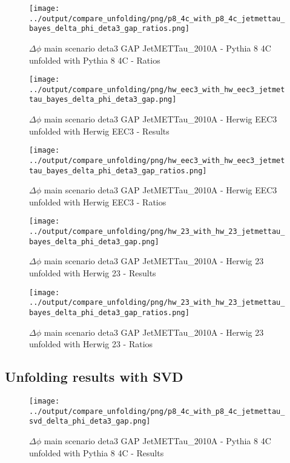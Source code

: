 \documentclass[11pt]{book}
\begin{document}
\begin{figure}[ht]
\centering
\texttt{[image: ../output/compare\_unfolding/png/p8\_4c\_with\_p8\_4c\_jetmettau\_bayes\_delta\_phi\_deta3\_gap\_ratios.png]}
\caption{$\Delta\phi$ main scenario deta3 GAP JetMETTau\_2010A - Pythia 8 4C unfolded with Pythia 8 4C - Ratios}
\label{p8_p8_jetmettau_bayes_delta_phi_deta3_gap_b}
\end{figure}

\begin{figure}[ht]
\centering
\texttt{[image: ../output/compare\_unfolding/png/hw\_eec3\_with\_hw\_eec3\_jetmettau\_bayes\_delta\_phi\_deta3\_gap.png]}
\caption{$\Delta\phi$ main scenario deta3 GAP JetMETTau\_2010A - Herwig EEC3 unfolded with Herwig EEC3 - Results}
\label{hw_eec3_hw_eec3_jetmettau_bayes_delta_phi_deta3_gap_a}
\end{figure}

\begin{figure}[ht]
\centering
\texttt{[image: ../output/compare\_unfolding/png/hw\_eec3\_with\_hw\_eec3\_jetmettau\_bayes\_delta\_phi\_deta3\_gap\_ratios.png]}
\caption{$\Delta\phi$ main scenario deta3 GAP JetMETTau\_2010A - Herwig EEC3 unfolded with Herwig EEC3 - Ratios}
\label{hw_eec3_hw_eec3_jetmettau_bayes_delta_phi_deta3_gap_b}
\end{figure}

\begin{figure}[ht]
\centering
\texttt{[image: ../output/compare\_unfolding/png/hw\_23\_with\_hw\_23\_jetmettau\_bayes\_delta\_phi\_deta3\_gap.png]}
\caption{$\Delta\phi$ main scenario deta3 GAP JetMETTau\_2010A - Herwig 23 unfolded with Herwig 23 - Results}
\label{hw_23_hw_23_jetmettau_bayes_delta_phi_deta3_gap_a}
\end{figure}

\begin{figure}[ht]
\centering
\texttt{[image: ../output/compare\_unfolding/png/hw\_23\_with\_hw\_23\_jetmettau\_bayes\_delta\_phi\_deta3\_gap\_ratios.png]}
\caption{$\Delta\phi$ main scenario deta3 GAP JetMETTau\_2010A - Herwig 23 unfolded with Herwig 23 - Ratios}
\label{hw_23_hw_23_jetmettau_bayes_delta_phi_deta3_gap_b}
\end{figure}

\clearpage
\subsection{Unfolding results with SVD}

\begin{figure}[ht]
\centering
\texttt{[image: ../output/compare\_unfolding/png/p8\_4c\_with\_p8\_4c\_jetmettau\_svd\_delta\_phi\_deta3\_gap.png]}
\caption{$\Delta\phi$ main scenario deta3 GAP JetMETTau\_2010A - Pythia 8 4C unfolded with Pythia 8 4C - Results}
\label{p8_p8_jetmettau_svd_delta_phi_deta3_gap_a}
\end{figure}
\end{document}
